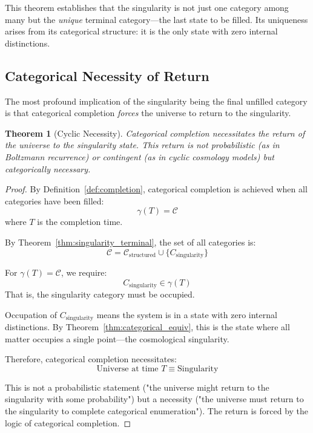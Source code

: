 \documentclass[12pt,a4paper]{article}
\newtheorem{theorem}{Theorem}[section]
\theoremstyle{definition}
\theoremstyle{remark}
\begin{document}
This theorem establishes that the singularity is not just one category among many but the \emph{unique} terminal category—the last state to be filled. Its uniqueness arises from its categorical structure: it is the only state with zero internal distinctions.

\subsection{Categorical Necessity of Return}

The most profound implication of the singularity being the final unfilled category is that categorical completion \emph{forces} the universe to return to the singularity.

\begin{theorem}[Cyclic Necessity]
\label{thm:cyclic_necessity}
Categorical completion necessitates the return of the universe to the singularity state. This return is not probabilistic (as in Boltzmann recurrence) or contingent (as in cyclic cosmology models) but categorically necessary.
\end{theorem}

\begin{proof}
By Definition~\ref{def:completion}, categorical completion is achieved when all categories have been filled:
\begin{equation}
\gamma(T) = \mathcal{C}
\end{equation}
where $T$ is the completion time.

By Theorem~\ref{thm:singularity_terminal}, the set of all categories is:
\begin{equation}
\mathcal{C} = \mathcal{C}_{\text{structured}} \cup \{C_{\text{singularity}}\}
\end{equation}

For $\gamma(T) = \mathcal{C}$, we require:
\begin{equation}
C_{\text{singularity}} \in \gamma(T)
\end{equation}
That is, the singularity category must be occupied.

Occupation of $C_{\text{singularity}}$ means the system is in a state with zero internal distinctions. By Theorem~\ref{thm:categorical_equiv}, this is the state where all matter occupies a single point—the cosmological singularity.

Therefore, categorical completion necessitates:
\begin{equation}
\text{Universe at time } T \equiv \text{Singularity}
\end{equation}

This is not a probabilistic statement ("the universe might return to the singularity with some probability") but a necessity ("the universe must return to the singularity to complete categorical enumeration"). The return is forced by the logic of categorical completion.
\end{proof}
\end{document}
